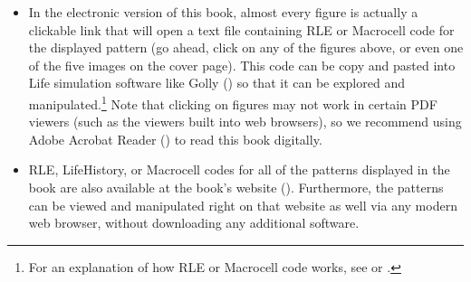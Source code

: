 \begin{itemize}
	\noindent\begin{minipage}{\linewidth}
		\centering
		\begin{minipage}[b]{0.56\textwidth}
			\centering
			\label{fig:preface_p15_gun}
		\end{minipage}\hfill
		\begin{minipage}[b]{0.4\textwidth}
			\centering
			\label{fig:preface_fx77_p5_eat}
		\end{minipage}\bigskip
	\end{minipage}
	
	\item In the electronic version of this book, almost every figure is actually a clickable link that will open a text file containing RLE or Macrocell code for the displayed pattern (go ahead, click on any of the figures above, or even one of the five images on the cover page). This code can be copy and pasted into Life simulation software like Golly () so that it can be explored and manipulated.\footnote{For an explanation of how RLE or Macrocell code works, see  or .} Note that clicking on figures may not work in certain PDF viewers (such as the viewers built into web browsers), so we recommend using Adobe Acrobat Reader () to read this book digitally.\smallskip
	
	\item RLE, LifeHistory, or Macrocell codes for all of the patterns displayed in the book are also available at the book's website (). Furthermore, the patterns can be viewed and manipulated right on that website as well via any modern web browser, without downloading any additional software.\medskip
\end{itemize}


